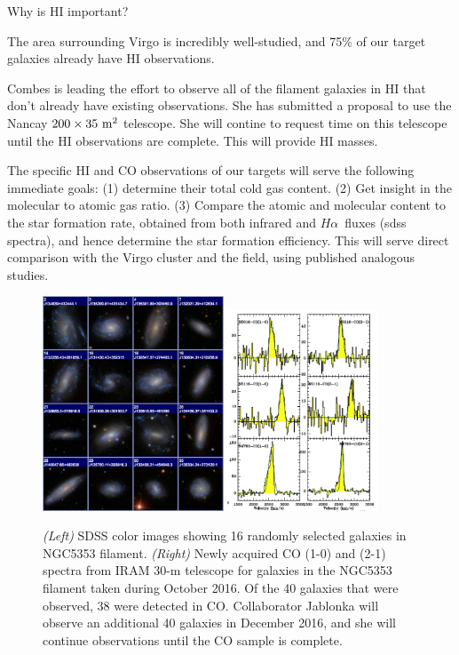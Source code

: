 \documentclass[11pt, preprint]{aastex}
\newcommand{\ha}{$H\alpha$}
\begin{document}
Why is HI important?

The area surrounding Virgo is incredibly well-studied, and 75\% of our
target galaxies already have HI observations.

Combes is leading the effort to observe all of the filament galaxies
in HI that don't already have existing observations.  She has
submitted a proposal to use the Nancay $\rm 200 \times 35~m^2$ telescope.
She will contine to request time on this telescope until the HI
observations are complete.  This will provide HI masses.

The specific HI and CO observations of our targets will serve the following immediate goals:
(1) determine their total cold gas content.  (2) Get insight in the
molecular to atomic gas ratio.  (3) Compare the atomic and molecular
content to the star formation rate, obtained from both infrared and
\ha \ fluxes
(sdss spectra), and hence determine the star formation efficiency. This will serve direct comparison with
the Virgo cluster and the field, using published analogous studies.

\begin{figure}[h]
\centering
\includegraphics[width=0.48\textwidth]{sdss-montage.png}
\includegraphics[width=0.4\textwidth]{CO-detection.png}
\caption{\small {\it (Left)} SDSS color images showing 16 randomly
  selected galaxies in NGC5353 filament.  {\it (Right)} Newly acquired
  CO (1-0) and (2-1) spectra
  from IRAM 30-m telescope for galaxies in the NGC5353 filament taken
  during October 2016.  Of the 40 galaxies that were observed, 38 were
detected in CO.  Collaborator Jablonka will observe an additional 40
galaxies in December 2016, and she will continue observations until
the CO sample is complete.}
\label{sdssCO}
\end{figure}
\end{document}
